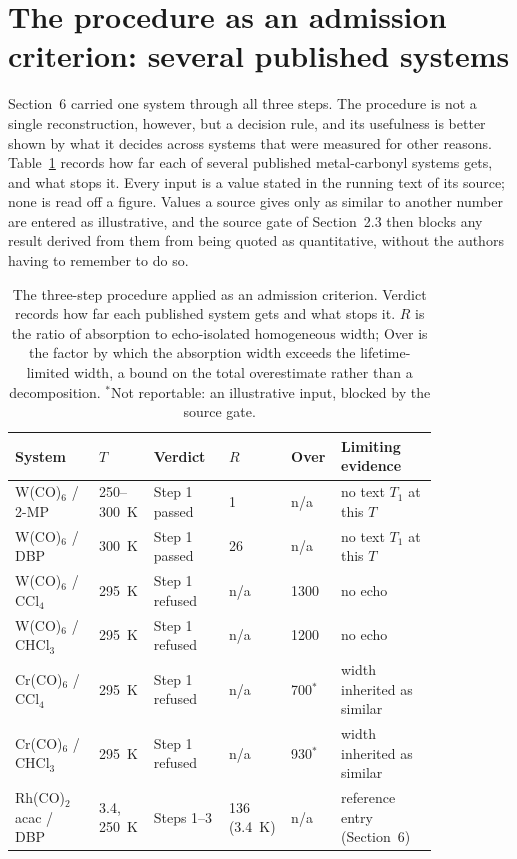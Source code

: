 \section{The procedure as an admission criterion: several published systems}

Section~6 carried one system through all three steps. The procedure is not a
single reconstruction, however, but a decision rule, and its usefulness is
better shown by what it decides across systems that were measured for other
reasons. Table~\ref{tab:admission} records how far each of several published
metal-carbonyl systems gets, and what stops it. Every input is a value stated in
the running text of its source; none is read off a figure. Values a source gives
only as similar to another number are entered as illustrative, and the source
gate of Section~2.3 then blocks any result derived from them from being quoted
as quantitative, without the authors having to remember to do so.

\begin{table}[htbp]
\centering\small
\noindent\begin{tabular}{@{}p{0.19\linewidth}p{0.09\linewidth}p{0.17\linewidth}p{0.08\linewidth}p{0.09\linewidth}p{0.22\linewidth}@{}}
\toprule
System & \(T\) & Verdict & \(R\) & Over & Limiting evidence \\
\midrule
W(CO)$_6$ / 2-MP & 250--300~K & Step 1 passed & 1 & n/a & no text \(T_1\) at this \(T\) \\
W(CO)$_6$ / DBP & 300~K & Step 1 passed & 26 & n/a & no text \(T_1\) at this \(T\) \\
W(CO)$_6$ / CCl$_4$ & 295~K & Step 1 refused & n/a & 1300 & no echo \\
W(CO)$_6$ / CHCl$_3$ & 295~K & Step 1 refused & n/a & 1200 & no echo \\
Cr(CO)$_6$ / CCl$_4$ & 295~K & Step 1 refused & n/a & 700\(^{*}\) & width inherited as similar \\
Cr(CO)$_6$ / CHCl$_3$ & 295~K & Step 1 refused & n/a & 930\(^{*}\) & width inherited as similar \\
Rh(CO)$_2$acac / DBP & 3.4, 250~K & Steps 1--3 & 136 (3.4~K) & n/a & reference entry (Section~6) \\
\bottomrule
\end{tabular}
\caption{The three-step procedure applied as an admission criterion. Verdict records how far each published system gets and what stops it. \(R\) is the ratio of absorption to echo-isolated homogeneous width; Over is the factor by which the absorption width exceeds the lifetime-limited width, a bound on the total overestimate rather than a decomposition. \(^{*}\)Not reportable: an illustrative input, blocked by the source gate.}
\label{tab:admission}
\end{table}

